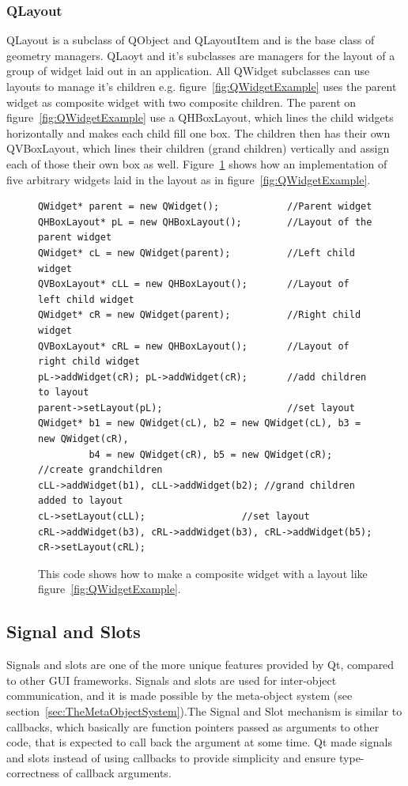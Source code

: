 \subsubsection{QLayout}
\label{sec:QLayout}
QLayout is a subclass of QObject and QLayoutItem and is the base class of geometry managers. QLaoyt and it's subclasses are managers for the layout of a group of widget laid out in an application. All QWidget subclasses can use layouts to manage it's children e.g. figure~\ref{fig:QWidgetExample} uses the parent widget as composite widget with two composite children. The parent on figure~\ref{fig:QWidgetExample} use a QHBoxLayout, which lines the child widgets horizontally and makes each child fill one box. The children then has their own QVBoxLayout, which lines their children (grand children) vertically and assign each of those their own box as well. Figure~\ref{fig:QLayoutCode} shows how an implementation of five arbitrary widgets laid in the layout as in figure~\ref{fig:QWidgetExample}.

\begin{figure}[h]
\centering
\lstset{language=C++} 
\begin{lstlisting}[frame=single]  
QWidget* parent = new QWidget();  			//Parent widget
QHBoxLayout* pL = new QHBoxLayout();		//Layout of the parent widget
QWidget* cL = new QWidget(parent); 			//Left child widget
QVBoxLayout* cLL = new QHBoxLayout();		//Layout of left child widget
QWidget* cR = new QWidget(parent); 			//Right child widget
QVBoxLayout* cRL = new QHBoxLayout();		//Layout of right child widget
pL->addWidget(cR); pL->addWidget(cR);		//add children to layout
parent->setLayout(pL);						//set layout
QWidget* b1 = new QWidget(cL), b2 = new QWidget(cL), b3 = new QWidget(cR),
		 b4 = new QWidget(cR), b5 = new QWidget(cR); //create grandchildren
cLL->addWidget(b1), cLL->addWidget(b2);	//grand children added to layout
cL->setLayout(cLL);					//set layout
cRL->addWidget(b3), cRL->addWidget(b3), cRL->addWidget(b5);				 
cR->setLayout(cRL);			 
\end{lstlisting}
\caption{This code shows how to make a composite widget with a layout like figure~\ref{fig:QWidgetExample}.}
\label{fig:QLayoutCode} 	
\end{figure}


\subsection{Signal and Slots}
\label{sec:signalandslots}
Signals and slots are one of the more unique features provided by Qt, compared to other GUI frameworks. Signals and slots are used for inter-object communication, and it is made possible by the meta-object system (see section~\ref{sec:TheMetaObjectSystem}).The Signal and Slot mechanism is similar to callbacks, which basically are function pointers passed as arguments to other code, that is expected to call back the argument at some time. Qt made signals and slots instead of using callbacks to provide simplicity and ensure type-correctness of callback arguments.

